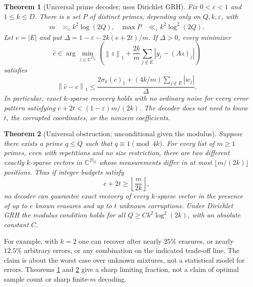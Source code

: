 \documentclass[11pt]{article}
\newtheorem{theorem}{Theorem}[section]
\theoremstyle{remark}\newtheorem{remark}[theorem]{Remark}
\newcommand{\C}{\mathbb C}
\newcommand{\D}{\mathcal D}
\newcommand{\norm}[1]{\left\lVert#1\right\rVert}
\newcommand{\abs}[1]{\left|#1\right|}
\newcommand{\eps}{\varepsilon}
\begin{document}
\begin{theorem}[Universal prime decoder; uses Dirichlet GRH]\label{thm:main}
Fix $0<\eps<1$ and $1\le k\le D$. There is a set $P$ of distinct primes, depending only on $Q,k,\eps$, with
\begin{align*}
 m&\asymp_\eps k^2\log(2Q),&
 \max P&\ll_\eps k^2\log^2(2Q).
\end{align*}
Let $e=\abs E$ and put $\Delta=1-\eps-2k(e+2t)/m$. If $\Delta>0$, every minimizer
\begin{equation}\label{eq:decoder}
 \widehat c\in\arg\min_{z\in\C^{\D_Q}}
 \left(\norm{z}_1+\frac{2k}{m}\sum_{j\notin E}\abs{y_j-(Az)_j}\right)
\end{equation}
satisfies
\begin{equation}\label{eq:stability}
 \norm{\widehat c-c}_1\le
 \frac{2\sigma_k(c)_1+(4k/m)\sum_{j\notin E}\abs{w_j}}{\Delta}.
\end{equation}
In particular, exact $k$-sparse recovery holds with no ordinary noise for every error pattern satisfying $e+2t<(1-\eps)m/(2k)$. The decoder does not need to know $t$, the corrupted coordinates, or the nonzero coefficients.
\end{theorem}

\begin{theorem}[Universal obstruction; unconditional given the modulus]\label{thm:lower}
Suppose there exists a prime $q\le Q$ such that $q\equiv1\pmod{4k}$. For every list of $m\ge1$ primes, even with repetitions and no size restriction, there are two different exactly $k$-sparse vectors in $\C^{\D_Q}$ whose measurements differ in at most $\lfloor m/(2k)\rfloor$ positions. Thus if integer budgets satisfy
\begin{equation}\label{eq:lower}
 e+2t\ge\left\lfloor\frac{m}{2k}\right\rfloor,
\end{equation}
no decoder can guarantee exact recovery of every $k$-sparse vector in the presence of up to $e$ known erasures and up to $t$ unknown corruptions. Under Dirichlet GRH the modulus condition holds for all $Q\ge C k^2\log^2(2k)$, with an absolute constant $C$.
\end{theorem}

For example, with $k=2$ one can recover after nearly $25\%$ erasures, or nearly $12.5\%$ arbitrary errors, or any combination on the indicated trade-off line. The claim is about the worst case over unknown mixtures, not a statistical model for errors. Theorems \ref{thm:main} and \ref{thm:lower} give a sharp limiting fraction, not a claim of optimal sample count or sharp finite-$m$ decoding.
\end{document}
